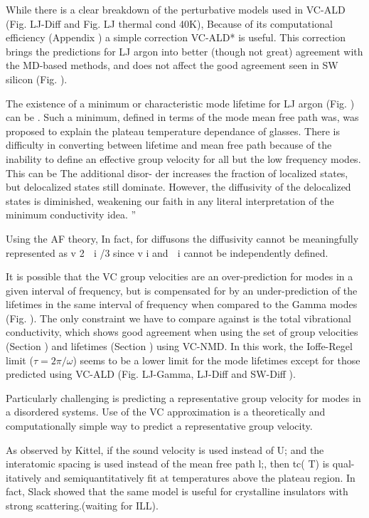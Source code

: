 \documentclass[aps,prb,twocolumn,superscriptaddress,amsmath,amssymb,floatfix]{revtex4}
\begin{document}
While there is a clear breakdown of the perturbative models used in  
VC-ALD (Fig. LJ-Diff and Fig. LJ thermal cond 40K), 
Because of its computational efficiency (Appendix ) a simple correction 
VC-ALD* is useful. This correction brings the predictions for LJ argon 
into better (though not great) agreement with the MD-based methods, and 
does not affect the good agreement seen in SW silicon (Fig. ). 

The existence of a minimum or characteristic mode lifetime for 
LJ argon (Fig. ) can be . Such a minimum, defined in terms of the mode 
mean free path was, was proposed to explain the plateau 
temperature dependance of glasses.\cite{graebner_phonon_1986} 
There is difficulty in converting 
between lifetime and mean free path because of the inability to 
define an effective group velocity for all but the low frequency modes. 
This can be 
The additional disor-
der increases the fraction of localized states, but delocalized states 
still dominate. However, the
diffusivity of the delocalized states is diminished, 
weakening our faith in any literal interpretation of the
minimum conductivity idea.
'' \cite{feldman_thermal_1993}

Using the AF theory, 
In fact, for diffusons the diffusivity cannot be meaningfully represented 
as v 2 ␶ i /3 since v i and ␶ i cannot be independently
defined.\cite{feldman_numerical_1999}

It is possible that the VC group velocities are an over-prediction 
for modes in a given interval of frequency, 
but is compensated for 
by an under-prediction of the lifetimes in the same interval of 
frequency when compared to the Gamma modes (Fig. ). The only constraint 
we have to compare against is the total vibrational conductivity, which 
shows good agreement when using the set of group velocities (Section )
and lifetimes (Section ) using VC-NMD. 
In this work, the Ioffe-Regel limit ($\tau = 2\pi/\omega $) seems to be 
a lower limit for the mode lifetimes except for those predicted 
using VC-ALD (Fig. LJ-Gamma, LJ-Diff and SW-Diff ).  

Particularly challenging is predicting a representative group velocity 
for modes in a disordered systems. 
Use of the VC approximation is a theoretically and 
computationally simple way to predict a representative group velocity.

As observed by Kittel, if the sound
velocity is used instead of U; and the interatomic spacing
is used instead of the mean free path l;, then tc( T) is qual-
itatively and semiquantitatively
fit at temperatures above
the plateau region.
In fact, Slack showed that the same model 
is useful for crystalline insulators with strong scattering.(waiting for 
ILL).\cite{henry_ehrenreich_thermal_1979}
\end{document}
